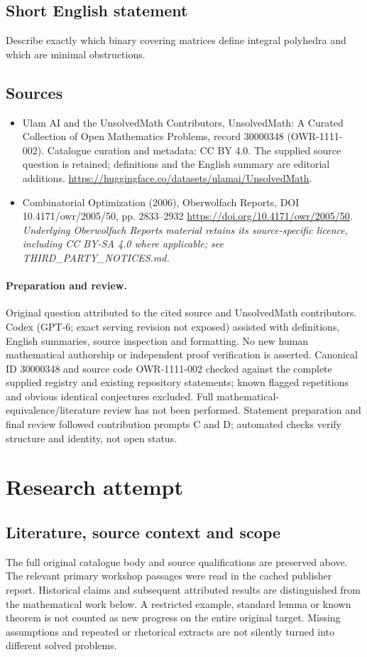 \documentclass[11pt]{article}
\begin{document}
\subsection{Short English statement}
Describe exactly which binary covering matrices define integral polyhedra and which are minimal obstructions.
\subsection{Sources}
\begin{itemize}
\item[S1] Ulam AI and the UnsolvedMath Contributors, UnsolvedMath: A Curated Collection of Open Mathematics Problems, record 30000348 (OWR-1111-002). Catalogue curation and metadata: CC BY 4.0. The supplied source question is retained; definitions and the English summary are editorial additions.
\url{https://huggingface.co/datasets/ulamai/UnsolvedMath}.
\item[S2] Combinatorial Optimization (2006), Oberwolfach Reports, DOI 10.4171/owr/2005/50, pp. 2833--2932
\url{https://doi.org/10.4171/owr/2005/50}.
\textit{Underlying Oberwolfach Reports material retains its source-specific licence, including CC BY-SA 4.0 where applicable; see THIRD\_PARTY\_NOTICES.md.}
\end{itemize}
\paragraph{Preparation and review.}
Original question attributed to the cited source and UnsolvedMath contributors. Codex (GPT-6; exact serving revision not exposed) assisted with definitions, English summaries, source inspection and formatting. No new human mathematical authorship or independent proof verification is asserted. Canonical ID 30000348 and source code OWR-1111-002 checked against the complete supplied registry and existing repository statements; known flagged repetitions and obvious identical conjectures excluded. Full mathematical-equivalence/literature review has not been performed. Statement preparation and final review followed contribution prompts C and D; automated checks verify structure and identity, not open status.
\label{end:30000348}

\section{Research attempt}
\subsection{Literature, source context and scope}
The full original catalogue body and source qualifications are preserved above. The relevant primary workshop passages were read in the cached publisher report. Historical claims and subsequent attributed results are distinguished from the mathematical work below. A restricted example, standard lemma or known theorem is not counted as new progress on the entire original target. Missing assumptions and repeated or rhetorical extracts are not silently turned into different solved problems.
\end{document}
